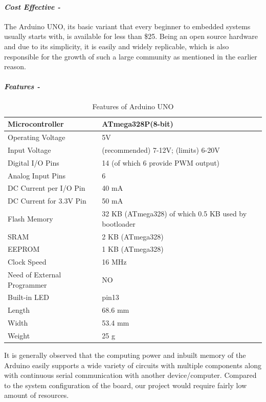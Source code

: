 \paragraph{\textit{Cost Effective -}}
The Arduino UNO, its basic variant that every beginner to embedded systems usually starts with, is available for less than \$25. Being an open source hardware and due to its simplicity, it is easily and widely replicable, which is also responsible for the growth of such a large community as mentioned in the earlier reason.
\paragraph{\textit{Features -}} 
\begin{table}
	\centering
	\begin{tabular}{|l|l|}
		\hline
		Microcontroller &ATmega328P(8-bit)\\
		\hline
		Operating Voltage &5V\\
		\hline
		Input Voltage  &(recommended) 7-12V; (limits) 6-20V\\
		\hline
		Digital I/O Pins &14 (of which 6 provide PWM output)\\
		\hline
		Analog Input Pins &6\\
		\hline
		DC Current per I/O Pin &40 mA\\
		\hline
		DC Current for 3.3V Pin &50 mA\\
		\hline
		Flash Memory &32 KB (ATmega328) of which 0.5 KB used by bootloader\\
		\hline
		SRAM &2 KB (ATmega328)\\
		\hline
		EEPROM &1 KB (ATmega328)\\
		\hline
		Clock Speed &16 MHz\\
		\hline
		Need of External Programmer &NO\\
		\hline
		Built-in LED &pin13\\
		\hline
		Length &68.6 mm\\
		\hline
		Width &53.4 mm\\
		\hline
		Weight &25 g\\
		\hline
	\end{tabular}
	\caption{Features of Arduino UNO}
	\label{tab:FeaturesArduino}
\end{table}
It is generally observed that the computing power and inbuilt memory of the Arduino easily supports a wide variety of circuits with multiple components along with continuous serial communication with another device/computer. Compared to the system configuration of the board, our project would require fairly low amount of resources. \vspace{0.1cm} \linebreak 

